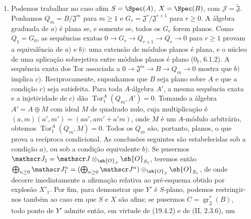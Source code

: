 \begin{enumerate}
  \item[(i)] Podemos trabalhar no caso afim $S=\Spec(A)$, $X=\Spec(B)$, com $\mathscr J=\widetilde{\mathfrak J}$. Ponhamos $Q_m=B/\mathfrak J^m$ para $m\geq1$ e $G_r=\mathfrak J^r/\mathfrak J^{r+1}$ para $r\geq0$. A álgebra graduada de $a)$ é plana se, e somente se, todos os $G_r$ forem planos. Como $Q_1=G_0$, as sequências exatas $0\to G_r\to Q_{r+1}\to Q_r\to0$ para $r\geq1$ provam a equivalência de $a)$ e $b)$: uma extensão de módulos planos é plana, e o núcleo de uma aplicação sobrejetiva entre módulos planos é plano ($0_{\mathrm I}$, 6.1.2). A sequência exata dos Tor associada a $0\to\mathfrak J^m\to B\to Q_m\to0$ mostra que $b)$ implica $c)$. Reciprocamente, suponhamos que $B$ seja plano sobre $A$ e que a condição $c)$ seja satisfeita. Para toda $A$-álgebra $A'$, a mesma sequência exata e a injetividade de $c)$ dão $\operatorname{Tor}_1^A(Q_m,A')=0$. Tomando a álgebra $A'=A\oplus M$ com ideal $M$ de quadrado nulo, cuja multiplicação é $(a,m)(a',m')=(aa',am'+a'm)$, onde $M$ é um $A$-módulo arbitrário, obtemos $\operatorname{Tor}_1^A(Q_m,M)=0$. Todos os $Q_m$ são, portanto, planos, o que prova a recíproca condicional. As conclusões seguintes são estabelecidas sob a condição $a)$, ou sob a condição equivalente $b)$. Se pusermos $\mathscr J_1=\mathscr J\otimes_{\sh{O}_S}\sh{O}_{S_1}$, teremos então $\bigoplus_{n\geq0}\mathscr J_1^n=(\bigoplus_{n\geq0}\mathscr J^n)\otimes_{\sh{O}_S}\sh{O}_{S_1}$, de onde decorre imediatamente a afirmação relativa ao pré-esquema obtido por explosão $X'_1$. Por fim, para demonstrar que $Y'$ é $S$-plano, podemos restringir-nos também ao caso em que $S$ e $X$ são afins; se pusermos $C=\operatorname{gr}_{\mathfrak J}^*(B)$, todo ponto de $Y'$ admite então, em virtude de (19.4.2) e de (II, 2.3.6), um



\end{enumerate}
